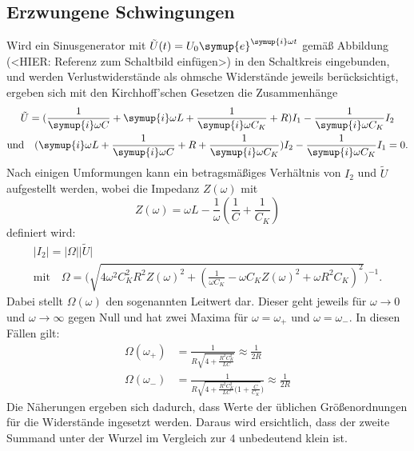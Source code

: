 \subsection{Erzwungene Schwingungen}
Wird ein Sinusgenerator mit ${\tilde{U}(t)=U_0 \symup{e}^{\symup{i}\omega t}}$ gemäß Abbildung (<HIER: Referenz zum Schaltbild einfügen>) in den Schaltkreis 
eingebunden, und werden Verlustwiderstände als ohmsche Widerstände jeweils berücksichtigt, ergeben sich mit den Kirchhoff'schen 
Gesetzen die Zusammenhänge 
\begin{gather}
    \tilde{U}=(\frac{1}{\symup{i}\omega C} +  \symup{i} \omega L + \frac{1}{\symup{i}\omega C_K} + R)I_1 - \frac{1}{\symup{i}\omega C_K} I_2 \\
    \text{und} \quad (\symup{i}\omega L + \frac{1}{\symup{i}\omega C} + R+ \frac{1}{\symup{i}\omega C_K}) I_2 - \frac{1}{\symup{i}\omega C_K}I_1 =0 \text{.}
\end{gather}
Nach einigen Umformungen kann ein betragsmäßiges Verhältnis von $I_2$ und $\tilde{U}$ aufgestellt werden, wobei die Impedanz ${Z(\omega)}$ mit 
\begin{equation*}
    Z(\omega) = \omega L - \frac{1}{\omega} (\frac{1}{C} + \frac{1}{C_K})    
\end{equation*}
definiert wird:
\begin{gather}
    \lvert I_2 \rvert = \lvert \Omega \rvert \lvert \tilde{U} \rvert \\ 
    \text{mit} \quad \Omega = \Biggl(\sqrt{4 \omega ^2 C_K^2 R^2 Z(\omega)^2 + (\frac{1}{\omega C_K} - \omega C_K Z(\omega)^2 + \omega R^2 C_K)^2 }\Biggr)^{-1} .
\end{gather}
Dabei stellt $\Omega (\omega)$ den sogenannten Leitwert dar. 
Dieser geht jeweils für ${\omega \to 0}$ und ${\omega \to \infty }$ gegen Null und hat zwei Maxima für ${\omega = \omega _+}$ und 
${\omega = \omega _-}$. 
In diesen Fällen gilt:
\begin{align}
    \Omega (\omega _+) &= \frac{1}{R\sqrt{4 + \frac{R^2C_K^2}{LC}}} \approx \frac{1}{2R} \\
    \Omega (\omega _-) &= \frac{1}{R\sqrt{4 + \frac{R^2C_K^2}{LC}(1 + \frac{C}{C_K}})} \approx \frac{1}{2R}  
\end{align}
Die Näherungen ergeben sich dadurch, dass Werte der üblichen Größenordnungen für die Widerstände ingesetzt werden.
Daraus wird ersichtlich, dass der zweite Summand unter der Wurzel im Vergleich zur $4$ unbedeutend klein ist. 
